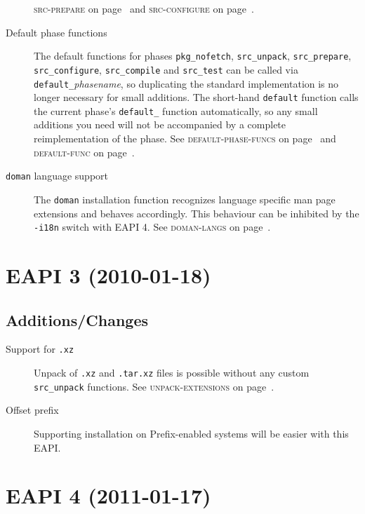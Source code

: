 \documentclass[a4paper]{leaflet}
\newcommand{\code}[1]{\texttt{#1}}
\newcommand{\featureref}[1]{\textsc{#1} on page~\pageref{feat:#1}}
\begin{document}
\begin{description}
    \featureref{src-prepare} and \featureref{src-configure}.
    \item[Default phase functions] The default functions for
    phases \code{pkg\_nofetch}, \code{src\_unpack},
    \code{src\_prepare}, \code{src\_configure}, \code{src\_compile}
    and \code{src\_test} can be called via
    \code{default\_}\emph{phasename}, so duplicating the standard
    implementation is no longer necessary for small additions.  The
    short-hand \code{default} function calls the current phase's
    \code{default\_} function automatically, so any small additions
    you need will not be accompanied by a complete reimplementation of
    the phase.  See \featureref{default-phase-funcs} and
    \featureref{default-func}.
    \item[\code{doman} language support] The \code{doman} installation
    function recognizes language specific man page extensions and
    behaves accordingly.  This behaviour can be inhibited by the
    \code{-i18n} switch with EAPI 4.  See \featureref{doman-langs}.
\end{description}

\section{EAPI 3 (2010-01-18)}
\label{sec:cs:eapi3}
\subsection{Additions/Changes}
\label{sec:cs:eapi3-additions}
\begin{description}
    \item[Support for \code{.xz}] Unpack of \code{.xz} and
    \code{.tar.xz} files is possible without any custom
    \code{src\_unpack} functions.  See \featureref{unpack-extensions}.
    \item[Offset prefix] Supporting installation on Prefix-enabled
    systems will be easier with this EAPI.
\end{description}

\section{EAPI 4 (2011-01-17)}
\label{sec:cs:eapi4}
\end{document}
